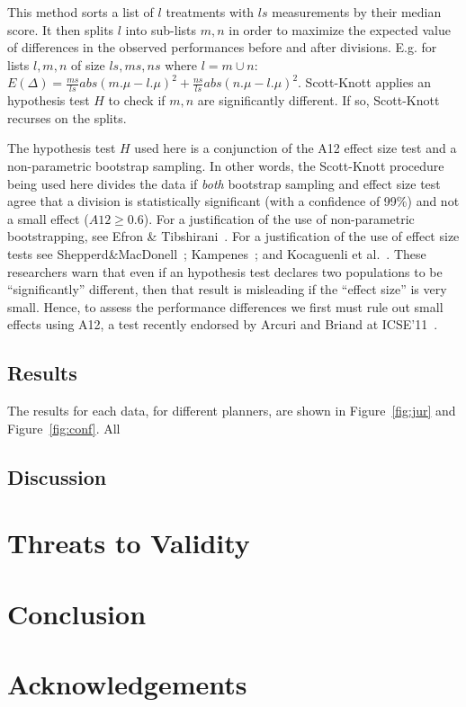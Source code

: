 \documentclass{sig-alternate}
\newcommand{\fig}[1]{Figure~\ref{fig:#1}}
\begin{document}
This method
sorts a list of $l$ treatments with $ls$ measurements by their median
score. It then
splits $l$ into sub-lists $m,n$ in order to maximize the expected value of
 differences  in the observed performances
before and after divisions. E.g. for lists $l,m,n$ of size $ls,ms,ns$ where $l=m\cup n$:
 $E(\Delta)=\frac{ms}{ls}abs(m.\mu - l.\mu)^2 + \frac{ns}{ls}abs(n.\mu - l.\mu)^2$.
Scott-Knott  applies an  hypothesis test $H$ to check
if $m,n$ are significantly different. If so, Scott-Knott  recurses on the splits.

The hypothesis test $H$ used here is a conjunction of the A12 effect size test and a non-parametric bootstrap sampling. In other words, the Scott-Knott procedure being used here divides the data if \textit{both} bootstrap sampling and effect size test agree that a division is statistically significant (with a confidence of 99\%) and not a small effect ($A12 \ge 0.6$). For a justification of the use of non-parametric bootstrapping, see Efron \& Tibshirani~\cite[p220-223]{efron93}. For a justification of the use of effect size tests see Shepperd\&MacDonell~\cite{shepperd12a}; Kampenes~\cite{kampenes07}; and Kocaguenli et al.~\cite{Kocaguneli2013:ep}. These researchers warn that even if an hypothesis test declares two populations to be ``significantly'' different, then that result is misleading if the ``effect size'' is very small. Hence, to assess the performance differences we first must rule out small effects using A12, a test   recently endorsed by Arcuri and Briand at ICSE'11~\cite{arcuri11}.

\subsection{Results}

The results for each data, for different planners, are shown in \fig{jur} and \fig{conf}. All
\subsection{Discussion}
\section{Threats to Validity}
\section{Conclusion}
\section*{Acknowledgements}



\end{document}
